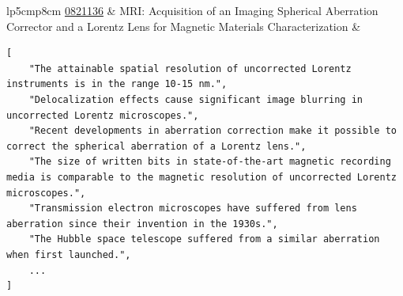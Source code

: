 \documentclass[11pt]{article}
\begin{document}
\begin{table}[h]
\begin{tabular}{lp{5cm}p{8cm}}
         \href{https://www.nsf.gov/awardsearch/showAward?AWD_ID=0821136&HistoricalAwards=false}{0821136} & MRI: Acquisition of an Imaging Spherical Aberration Corrector and a Lorentz Lens for Magnetic Materials Characterization & \begin{minipage}{\linewidth}
\begin{lstlisting}
[
    "The attainable spatial resolution of uncorrected Lorentz instruments is in the range 10-15 nm.",
    "Delocalization effects cause significant image blurring in uncorrected Lorentz microscopes.",
    "Recent developments in aberration correction make it possible to correct the spherical aberration of a Lorentz lens.",
    "The size of written bits in state-of-the-art magnetic recording media is comparable to the magnetic resolution of uncorrected Lorentz microscopes.",
    "Transmission electron microscopes have suffered from lens aberration since their invention in the 1930s.",
    "The Hubble space telescope suffered from a similar aberration when first launched.",
    ...
]
\end{lstlisting}
\end{minipage} \\
    \bottomrule
    \end{tabular}
    \caption{A sample of extracted claims from the \DatasetNameMatSci~dataset. Award IDs are hyperlinked to the NSF's Award database.}
    \label{tab:claim-examples}
\end{table}
\end{document}
